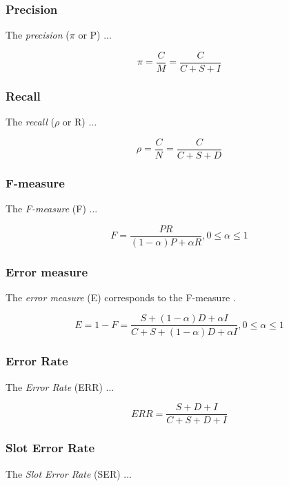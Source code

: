 \subsubsection{Precision}
The \textit{precision} (\ensuremath{\pi} or P) ...

\begin{displaymath}
	\pi = \frac{C}{M} = \frac{C}{C+S+I}
\end{displaymath}

\subsubsection{Recall}
The \textit{recall} (\ensuremath{\rho} or R) ...

\begin{displaymath}
	\rho = \frac{C}{N} = \frac{C}{C+S+D}
\end{displaymath}

\subsubsection{F-measure}
The \textit{F-measure} (F) ...

\begin{displaymath}
	F = \frac{PR}{(1-\alpha)P + {\alpha}R}, 0\le\alpha{\le}1
\end{displaymath}

\subsubsection{Error measure}
The \textit{error measure} (E) corresponds to the F-measure \cite{Feilmayr:2012}.

\begin{displaymath}
	E = 1-F = \frac{S+(1-\alpha)D+{\alpha}I}{C+S+(1-\alpha)D+{\alpha}I}, 0\le\alpha{\le}1
\end{displaymath}

\subsubsection{Error Rate}
The \textit{Error Rate} (ERR) ...

\begin{displaymath}
	ERR = \frac{S+D+I}{C+S+D+I}
\end{displaymath}

\subsubsection{Slot Error Rate}
The \textit{Slot Error Rate} (SER) ... 

